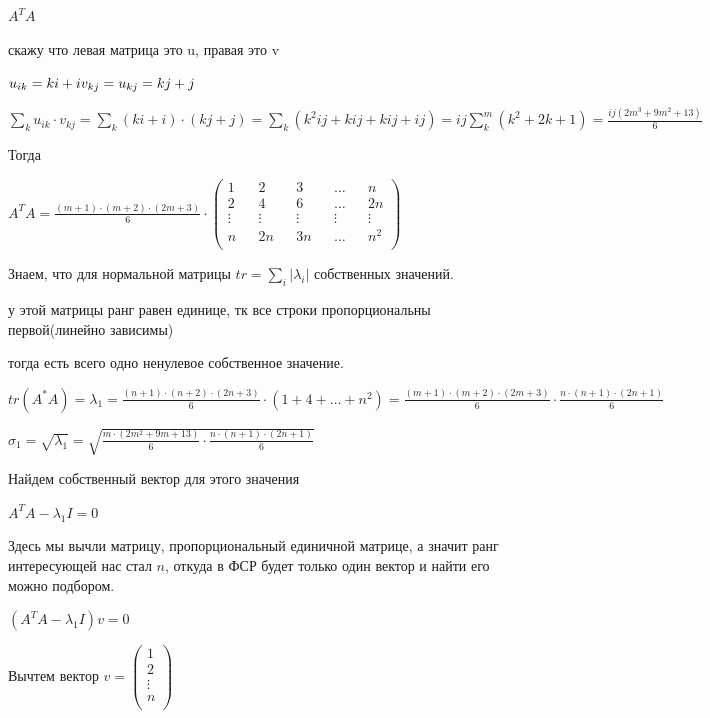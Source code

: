 \documentclass[a4paper, 11pt]{article}
\begin{document}
\begin{enumerate}
			$A^T A$
			
			скажу что левая матрица это u, правая это v
			
			$u_{ik} = ki + i \\ v_{kj} = u_{kj} = kj + j$
			
			$\displaystyle \sum_k u_{ik} \cdot v_{kj} = \sum_k (ki + i) \cdot (kj + j) = \sum_k (k^2 i j + kij + kij + ij) = ij \sum_k^m (k^2 + 2k + 1) = \frac{ij (2m^3 + 9m^2 +13)}{6}$
			
			Тогда 
			
			$A^T A = \frac{(m + 1) \cdot (m + 2) \cdot (2m + 3)}{6} \cdot \begin{pmatrix}
				1 && 2 && 3 && \dots && n \\
				2 && 4 && 6 && \dots && 2n \\
				\vdots && \vdots && \vdots && \vdots && \vdots \\
				n && 2n && 3n && \dots && n^2 \\
			\end{pmatrix}$
		
			Знаем, что для нормальной матрицы $\displaystyle tr = \sum_i |\lambda_i|$ собственных значений.
			
			у этой матрицы ранг равен единице, тк все строки пропорциональны первой(линейно зависимы)
			
			тогда есть всего одно ненулевое собственное значение.
			
			$tr (A^*A) = \lambda_1 = \frac{(n + 1) \cdot (n + 2) \cdot (2n + 3)}{6} \cdot (1 + 4 + \dots + n^2 ) =  \frac{(m + 1) \cdot (m + 2) \cdot (2m + 3)}{6} \cdot \frac{n \cdot (n + 1 ) \cdot (2n + 1)}{6}$
			
			$\sigma_1 = \sqrt{\lambda_1} = \sqrt{\frac{m \cdot (2m^2 + 9m + 13)}{6} \cdot \frac{n \cdot (n + 1 ) \cdot (2n + 1)}{6}}$
			
				Найдем собственный вектор для этого значения
				
				$A^TA - \lambda_1 I = 0$
				
				Здесь мы вычли матрицу, пропорциональный единичной матрице, а значит ранг интересующей нас стал $n$, откуда в ФСР будет только один вектор и найти его можно подбором.
				
				$(A^TA - \lambda_1 I)v = 0$
				
				Вычтем вектор $v = \begin{pmatrix}
					1 \\
					2 \\ 
					\vdots \\
					n \\
				\end{pmatrix}$
				

\end{enumerate}
\end{document}
